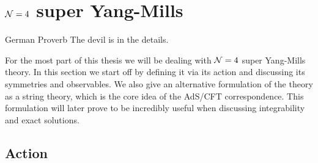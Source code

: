 
\section{$\mathcal{N}=4$ super Yang-Mills}

\begin{chapquote}{German Proverb}
The devil is in the details.
\end{chapquote}

\noindent For the most part of this thesis we will be dealing with $\mathcal{N}=4$ super Yang-Mills theory. 
In this section we start off by defining it via its action and discussing its symmetries and observables. 
We also give an alternative formulation of the theory as a string theory, which is the core idea of the AdS/CFT correspondence. 
This formulation will later prove to be incredibly useful when discussing integrability and exact solutions.

\subsection{Action}

